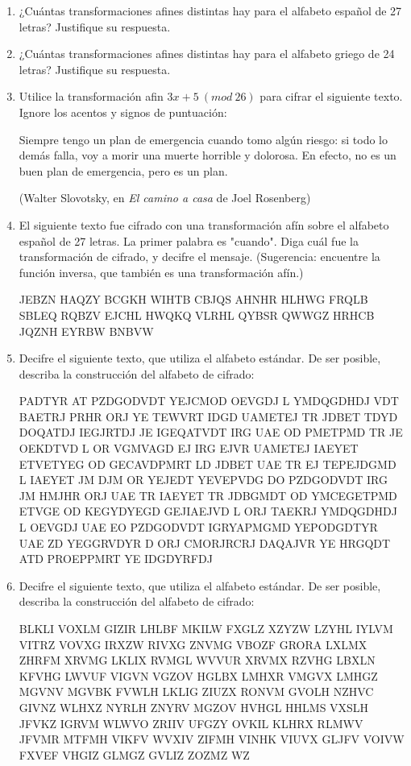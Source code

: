 \documentclass[12pt]{article}
\begin{document}
\begin{enumerate}
\item ¿Cuántas transformaciones afines distintas hay para el alfabeto español de 27 letras? Justifique su respuesta.

\item ¿Cuántas transformaciones afines distintas hay para el alfabeto griego de 24 letras? Justifique su respuesta.

\item Utilice la transformación afin $3x + 5\ (mod\ 26)$ para cifrar el siguiente texto. Ignore los acentos y signos de puntuación:

Siempre tengo un plan de emergencia cuando  tomo algún riesgo: si todo lo demás falla, voy a morir una muerte horrible
y dolorosa. En efecto, no es un buen plan de emergencia, pero
es un plan.

(Walter Slovotsky, en {\it El camino a casa} de Joel Rosenberg)

\item El siguiente texto fue cifrado con una transformación afín sobre el alfabeto español de 27 letras.
La primer palabra es "cuando". Diga cuál fue la transformación de cifrado, y decifre el mensaje. (Sugerencia: encuentre la función inversa, que también es una transformación afín.)

JEBZN HAQZY BCGKH WIHTB CBJQS AHNHR HLHWG FRQLB SBLEQ
RQBZV EJCHL HWQKQ VLRHL QYBSR QWWGZ HRHCB JQZNH EYRBW
BNBVW

\item Decifre el siguiente texto, que utiliza el alfabeto estándar. De ser posible, describa la construcción del alfabeto de cifrado:

PADTYR AT PZDGODVDT YEJCMOD OEVGDJ L YMDQGDHDJ VDT BAETRJ
PRHR ORJ YE TEWVRT IDGD UAMETEJ TR JDBET TDYD DOQATDJ
IEGJRTDJ JE IGEQATVDT IRG UAE OD PMETPMD TR JE OEKDTVD
L OR VGMVAGD EJ IRG EJVR UAMETEJ IAEYET ETVETYEG OD
GECAVDPMRT LD JDBET UAE TR EJ TEPEJDGMD L IAEYET JM
DJM OR YEJEDT YEVEPVDG DO PZDGODVDT IRG JM HMJHR ORJ
UAE TR IAEYET TR JDBGMDT OD YMCEGETPMD ETVGE OD KEGYDYEGD
GEJIAEJVD L ORJ TAEKRJ YMDQGDHDJ L OEVGDJ UAE EO PZDGODVDT
IGRYAPMGMD YEPODGDTYR UAE ZD YEGGRVDYR D ORJ CMORJRCRJ
DAQAJVR YE HRGQDT ATD PROEPPMRT YE IDGDYRFDJ


\item Decifre el siguiente texto, que utiliza el alfabeto estándar. De ser posible, describa la construcción del alfabeto de cifrado: 

BLKLI VOXLM GIZIR LHLBF MKILW FXGLZ XZYZW LZYHL IYLVM
VITRZ VOVXG IRXZW RIVXG ZNVMG VBOZF GRORA LXLMX ZHRFM
XRVMG LKLIX RVMGL WVVUR XRVMX RZVHG LBXLN KFVHG LWVUF
VIGVN VGZOV HGLBX LMHXR VMGVX LMHGZ MGVNV MGVBK FVWLH
LKLIG ZIUZX RONVM GVOLH NZHVC GIVNZ WLHXZ NYRLH ZNYRV
MGZOV HVHGL HHLMS VXSLH JFVKZ IGRVM WLWVO ZRIIV UFGZY
OVKIL KLHRX RLMWV JFVMR MTFMH VIKFV WVXIV ZIFMH VINHK
VIUVX GLJFV VOIVW FXVEF VHGIZ GLMGZ GVLIZ ZOZMZ WZ

\end{enumerate}
\end{document}
